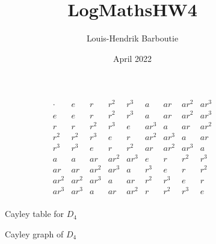 \documentclass{article}
\title{LogMathsHW4}
\author{Louis-Hendrik Barboutie}
\date{April 2022}
\begin{document}
\maketitle

\begin{figure}[!ht]
    \[
    \begin{array}{c|cccccccc}
        \cdot & e    & r    & r^2  & r^3  & a    & ar   & ar^2 & ar^3 \\ \hline
        e     & e    & r    & r^2  & r^3  & a    & ar   & ar^2 & ar^3 \\
        r     & r    & r^2  & r^3  & e    & ar^3 & a    & ar   & ar^2 \\
        r^2   & r^2  & r^3  & e    & r    & ar^2 & ar^3 & a    & ar   \\
        r^3   & r^3  & e    & r    & r^2  & ar   & ar^2 & ar^3 & a    \\
        a     & a    & ar   & ar^2 & ar^3 & e    & r    & r^2  & r^3  \\
        ar    & ar   & ar^2 & ar^3 & a    & r^3  & e    & r    & r^2  \\
        ar^2  & ar^2 & ar^3 & a    & ar   & r^2  & r^3  & e    & r    \\
        ar^3  & ar^3 & a    & ar   & ar^2 & r    & r^2  & r^3  & e    \\
    \end{array}
    \]
    \caption{Cayley table for $D_4$}
\end{figure}

\begin{figure}[!ht]
    \centering
    \caption{Cayley graph of $D_4$}
\end{figure}
\end{document}
